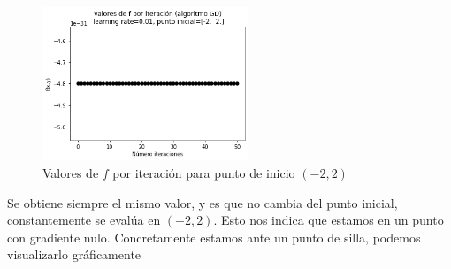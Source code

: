 \documentclass[11pt,a4paper]{article}
\theoremstyle{definition}
\begin{document}
\begin{itemize}
	\begin{figure}[H]
	\centering
	\includegraphics[width=0.55\textwidth]{images/1_3b_5}
	\caption{Valores de $f$ por iteración para punto de inicio $(-2,2)$}
	\end{figure}
	
	Se obtiene siempre el mismo valor, y es que no cambia del punto inicial, constantemente se evalúa en $(-2,2)$. Esto nos indica que estamos en un punto con gradiente nulo. Concretamente estamos ante un punto de silla, podemos visualizarlo gráficamente

	

\end{itemize}
\end{document}
